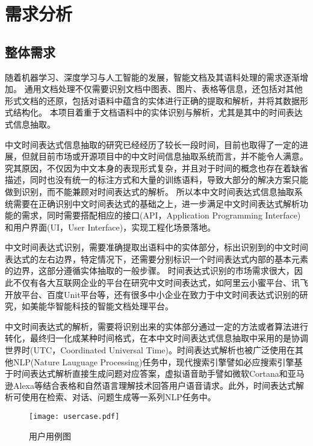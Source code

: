
\chapter{需求分析}

\section{整体需求}

随着机器学习、深度学习与人工智能的发展，智能文档及其语料处理的需求逐渐增加。
通用文档处理不仅需要识别文档中图表、图片、表格等信息，还包括对其他形式文档的还原，包括对语料中蕴含的实体进行正确的提取和解析，并将其数据形式结构化。
本项目着重于文档语料中的实体识别与解析，尤其是其中的时间表达式信息抽取。

中文时间表达式信息抽取的研究已经经历了较长一段时间，目前也取得了一定的进展，但就目前市场或开源项目中的中文时间信息抽取系统而言，并不能令人满意。
究其原因，不仅因为中文本身的表现形式复杂，并且对于时间的概念也存在着缺省描述，同时也没有统一的标注方式和大量的训练语料，导致大部分的解决方案只能做到识别，而不能兼顾对时间表达式的解析。
所以本中文时间表达式信息抽取系统需要在正确识别中文时间表达式的基础之上，进一步满足中文时间表达式解析功能的需求，同时需要搭配相应的接口(API，Application Programming Interface)和用户界面(UI，User Interface)，实现工程化场景落地。

中文时间表达式识别，需要准确提取出语料中的实体部分，标出识别到的中文时间表达式的左右边界，特定情况下，还需要分别标识一个时间表达式内部的基本元素的边界，这部分遵循实体抽取的一般步骤。
时间表达式识别的市场需求很大，因此不仅有各大互联网企业的平台在研究中文时间表达式，如阿里云小蜜平台、讯飞开放平台、百度Unit平台等，还有很多中小企业在致力于中文时间表达式识别的研究，如美能华智能科技的智能文档处理平台。

中文时间表达式的解析，需要将识别出来的实体部分通过一定的方法或者算法进行转化，最终归一化成某种时间格式，在本中文时间表达式信息抽取中采用的是协调世界时(UTC，Coordinated Universal Time)。时间表达式解析也被广泛使用在其他NLP(Nature Lauguage Processing)任务中，现代搜索引擎譬如必应搜索引擎基于时间表达式解析直接生成问题对应答案，虚拟语音助手譬如微软Cortana和亚马逊Alexa等结合表格和自然语言理解技术回答用户语音请求。此外，时间表达式解析可使用在检索、对话、问题生成等一系列NLP任务中。

\begin{figure}[h]
    \centering
    \texttt{[image: usercase.pdf]}
    \caption{用户用例图}
    \label{fig:usecase}
\end{figure}


